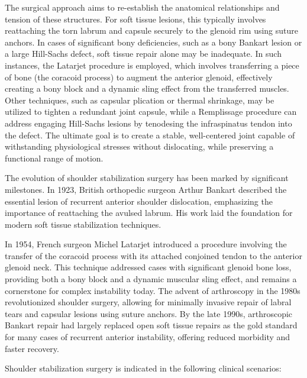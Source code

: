 The surgical approach aims to re-establish the anatomical relationships and tension of these structures. For soft tissue lesions, this typically involves reattaching the torn labrum and capsule securely to the glenoid rim using suture anchors. In cases of significant bony deficiencies, such as a bony Bankart lesion or a large Hill-Sachs defect, soft tissue repair alone may be inadequate. In such instances, the Latarjet procedure is employed, which involves transferring a piece of bone (the coracoid process) to augment the anterior glenoid, effectively creating a bony block and a dynamic sling effect from the transferred muscles. Other techniques, such as capsular plication or thermal shrinkage, may be utilized to tighten a redundant joint capsule, while a Remplissage procedure can address engaging Hill-Sachs lesions by tenodesing the infraspinatus tendon into the defect. The ultimate goal is to create a stable, well-centered joint capable of withstanding physiological stresses without dislocating, while preserving a functional range of motion.

The evolution of shoulder stabilization surgery has been marked by significant milestones. In 1923, British orthopedic surgeon Arthur Bankart described the essential lesion of recurrent anterior shoulder dislocation, emphasizing the importance of reattaching the avulsed labrum. His work laid the foundation for modern soft tissue stabilization techniques.

In 1954, French surgeon Michel Latarjet introduced a procedure involving the transfer of the coracoid process with its attached conjoined tendon to the anterior glenoid neck. This technique addressed cases with significant glenoid bone loss, providing both a bony block and a dynamic muscular sling effect, and remains a cornerstone for complex instability today. The advent of arthroscopy in the 1980s revolutionized shoulder surgery, allowing for minimally invasive repair of labral tears and capsular lesions using suture anchors. By the late 1990s, arthroscopic Bankart repair had largely replaced open soft tissue repairs as the gold standard for many cases of recurrent anterior instability, offering reduced morbidity and faster recovery.

Shoulder stabilization surgery is indicated in the following clinical scenarios:

